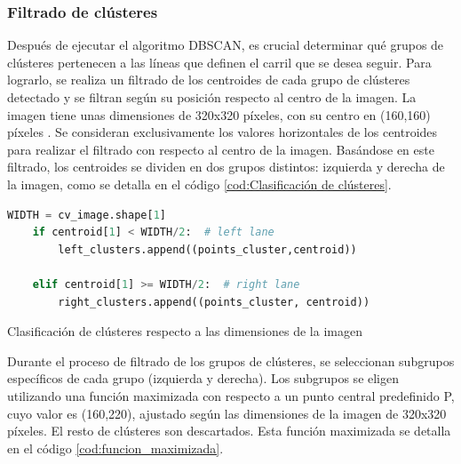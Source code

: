 \subsubsection{Filtrado de clústeres}
\label{clasificación:cluster}
Después de ejecutar el algoritmo DBSCAN, es crucial determinar qué grupos de clústeres pertenecen a las líneas que definen el carril que se desea seguir. 
Para lograrlo, se realiza un filtrado de los centroides de cada
grupo de clústeres detectado y se filtran según su posición respecto al centro de la imagen. La imagen tiene unas dimensiones de 320x320 píxeles, con su centro en (160,160) píxeles 
. Se consideran exclusivamente los valores horizontales de los centroides para realizar el filtrado con respecto al centro de la imagen. Basándose en este filtrado, 
los centroides se dividen en dos grupos distintos: izquierda y derecha de la imagen, como se detalla en el código \ref{cod:Clasificación de clústeres}. 

\begin{code}[h]
  \begin{lstlisting}[language=Python]
    WIDTH = cv_image.shape[1]
    if centroid[1] < WIDTH/2:  # left lane
        left_clusters.append((points_cluster,centroid))
       
    elif centroid[1] >= WIDTH/2:  # right lane
        right_clusters.append((points_cluster, centroid))
  \end{lstlisting}
  \caption[Clasificación de clústeres según las dimensiones de la imagen ]{Clasificación de clústeres respecto a las dimensiones de la imagen}
  \label{cod:Clasificación de clústeres}
  \end{code}  

Durante el proceso de filtrado de los grupos de clústeres, se seleccionan subgrupos específicos de cada grupo (izquierda y derecha). Los subgrupos se eligen utilizando una función 
maximizada con respecto a un punto central predefinido P, cuyo valor es (160,220), ajustado según las dimensiones de la imagen de 320x320 píxeles. El resto de clústeres son 
descartados. Esta función maximizada se detalla en el código \ref{cod:funcion_maximizada}. 

